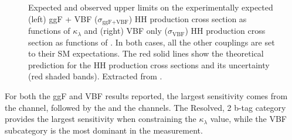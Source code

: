 \documentclass[../main.tex]{subfiles}
\begin{document}
\begin{figure}[h!]
\begin{center}
\end{center}
\caption[Constraints for $\kappa_\lambda$]{Expected and observed upper limits on the experimentally expected (left) ggF + VBF ($\sigma_{\text{ggF+VBF}}$) HH production cross section as functions of $\kappa_\lambda$ and (right) VBF only ($\sigma_{\text{VBF}}$) HH production cross section as functions of \kvv. In both cases, all the other couplings are set to their SM expectations. The red solid lines show the theoretical prediction for the HH production cross sections and its uncertainty (red shaded bands). Extracted from \cite{hh:analysis:run2}.}
\label{hh:fig:scans_r}
\end{figure}

%
%

For both the ggF and VBF results reported, the largest sensitivity comes from the \tauh\tauh{} channel, followed by the \taumu\tauh{} and the \taue\tauh{} channels. The Resolved, 2 b-tag category provides the largest sensitivity when constraining the $\kappa_\lambda$ value, while the VBF subcategory is the most dominant in the \kvv{} measurement.
\end{document}
